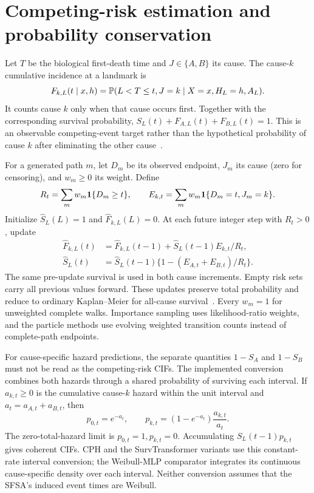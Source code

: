 \section{Competing-risk estimation and probability conservation}\label{app:cr}
Let $T$ be the biological first-death time and $J\in\{A,B\}$ its cause. The cause-$k$ cumulative incidence at a landmark is
\[
F_{k,L}(t\mid x,h)=\mathbb P(L<T\le t,J=k\mid X=x,H_L=h,A_L).
\]
It counts cause $k$ only when that cause occurs first. Together with the corresponding survival probability, $S_L(t)+F_{A,L}(t)+F_{B,L}(t)=1$. This is an observable competing-event target rather than the hypothetical probability of cause $k$ after eliminating the other cause~\citep{putter2007}.

For a generated path $m$, let $D_m$ be its observed endpoint, $J_m$ its cause (zero for censoring), and $w_m\ge0$ its weight. Define
\[
R_t=\sum_mw_m\mathbf 1\{D_m\ge t\},\qquad
E_{k,t}=\sum_mw_m\mathbf 1\{D_m=t,J_m=k\}.
\]
Initialize $\widehat S_L(L)=1$ and $\widehat F_{k,L}(L)=0$. At each future integer step with $R_t>0$, update
\begin{align}
\widehat F_{k,L}(t)&=\widehat F_{k,L}(t-1)+\widehat S_L(t-1)E_{k,t}/R_t,\\
\widehat S_L(t)&=\widehat S_L(t-1)\{1-(E_{A,t}+E_{B,t})/R_t\}.
\end{align}
The same pre-update survival is used in both cause increments. Empty risk sets carry all previous values forward. These updates preserve total probability and reduce to ordinary Kaplan--Meier for all-cause survival~\citep{aalen1978}. Every $w_m=1$ for unweighted complete walks. Importance sampling uses likelihood-ratio weights, and the particle methods use evolving weighted transition counts instead of complete-path endpoints.

For cause-specific hazard predictions, the separate quantities $1-S_A$ and $1-S_B$ must not be read as the competing-risk CIFs. The implemented conversion combines both hazards through a shared probability of surviving each interval. If $a_{k,t}\ge0$ is the cumulative cause-$k$ hazard within the unit interval and $a_t=a_{A,t}+a_{B,t}$, then
\begin{equation}\label{eq:crconversion}
p_{0,t}=e^{-a_t},\qquad
p_{k,t}=(1-e^{-a_t})\frac{a_{k,t}}{a_t}.
\end{equation}
The zero-total-hazard limit is $p_{0,t}=1,p_{k,t}=0$. Accumulating $S_L(t-1)p_{k,t}$ gives coherent CIFs. CPH and the SurvTransformer variants use this constant-rate interval conversion; the Weibull-MLP comparator integrates its continuous cause-specific density over each interval. Neither conversion assumes that the SFSA's induced event times are Weibull.

